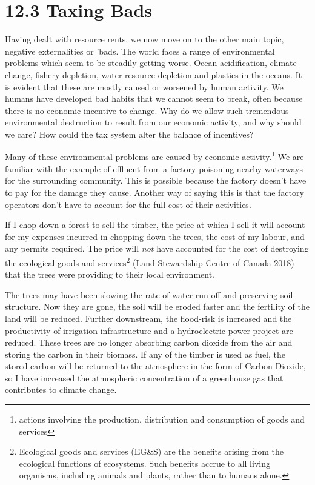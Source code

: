 \documentclass[]{tufte-handout}
\begin{document}
\hypertarget{taxing-bads}{%
\section{12.3 Taxing Bads}\label{taxing-bads}}

Having dealt with resource rents, we now move on to the other main
topic, negative externalities or 'bads. The world faces a range of
environmental problems which seem to be steadily getting worse. Ocean
acidification, climate change, fishery depletion, water resource
depletion and plastics in the oceans. It is evident that these are
mostly caused or worsened by human activity. We humans have developed
bad habits that we cannot seem to break, often because there is no
economic incentive to change. Why do we allow such tremendous
environmental destruction to result from our economic activity, and why
should we care? How could the tax system alter the balance of
incentives?

Many of these environmental problems are caused by economic
activity.\footnote{actions involving the production, distribution and
  consumption of goods and services} We are familiar with the example of
effluent from a factory poisoning nearby waterways for the surrounding
community. This is possible because the factory doesn't have to pay for
the damage they cause. Another way of saying this is that the factory
operators don't have to account for the full cost of their activities.

If I chop down a forest to sell the timber, the price at which I sell it
will account for my expenses incurred in chopping down the trees, the
cost of my labour, and any permits required. The price will \emph{not}
have accounted for the cost of destroying the ecological goods and
services\footnote{Ecological goods and services (EG\&S) are the benefits
  arising from the ecological functions of ecosystems. Such benefits
  accrue to all living organisms, including animals and plants, rather
  than to humans alone.} (Land Stewardship Centre of Canada
\protect\hyperlink{ref-LandStewardshipCentreofCanada2018}{2018}) that
the trees were providing to their local environment.

The trees may have been slowing the rate of water run off and preserving
soil structure. Now they are gone, the soil will be eroded faster and
the fertility of the land will be reduced. Further downstream, the
flood-risk is increased and the productivity of irrigation
infrastructure and a hydroelectric power project are reduced. These
trees are no longer absorbing carbon dioxide from the air and storing
the carbon in their biomass. If any of the timber is used as fuel, the
stored carbon will be returned to the atmosphere in the form of Carbon
Dioxide, so I have increased the atmospheric concentration of a
greenhouse gas that contributes to climate change.
\end{document}
